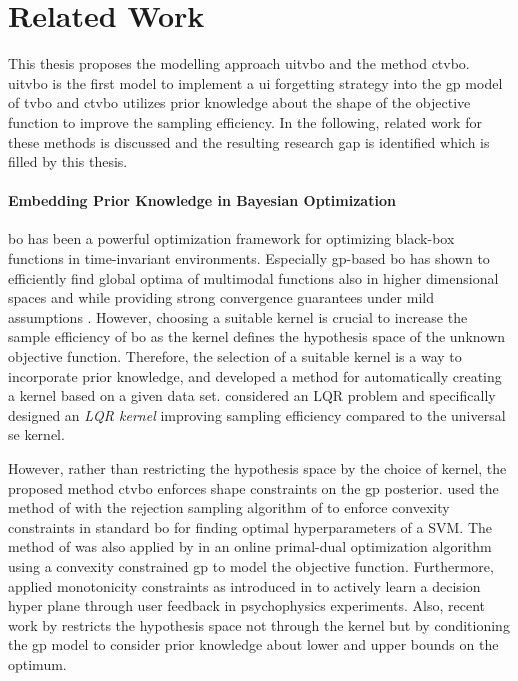 \chapter{Related Work}
\label{chap:related_work}


This thesis proposes the modelling approach \gls{uitvbo} and the method \gls{ctvbo}. \gls{uitvbo} is the first model to implement a \gls{ui} forgetting strategy into the \gls{gp} model of \gls{tvbo} and \gls{ctvbo} utilizes prior knowledge about the shape of the objective function to improve the sampling efficiency. In the following, related work for these methods is discussed and the resulting research gap is identified which is filled by this thesis.

\subsubsection{Embedding Prior Knowledge in Bayesian Optimization}

\gls{bo} has been a powerful optimization framework for optimizing black-box functions in time-invariant environments. Especially \gls{gp}-based \gls{bo} has shown to efficiently find global optima of multimodal functions also in higher dimensional spaces \cite{Snoek_2012} and while providing strong convergence guarantees under mild assumptions \cite{Srinivas_2010}. However, choosing a suitable kernel is crucial to increase the sample efficiency of \gls{bo} as the kernel defines the hypothesis space of the unknown objective function. Therefore, the selection of a suitable kernel is a way to incorporate prior knowledge, and \textcite{Duvenaud_2014} developed a method for automatically creating a kernel based on a given data set. \textcite{Marco_2017} considered an LQR problem and specifically designed an \emph{LQR kernel} improving sampling efficiency compared to the universal \gls{se} kernel.

However, rather than restricting the hypothesis space by the choice of kernel, the proposed method \gls{ctvbo} enforces shape constraints on the \gls{gp} posterior. \textcite{Jauch_2016} used the method of \textcite{Wang_2016} with the rejection sampling algorithm of \textcite{Botev2016} to enforce convexity constraints in standard \gls{bo} for finding optimal hyperparameters of a SVM. The method of \textcite{Wang_2016} was also applied by \textcite{Ospina_2021} in an online primal-dual optimization algorithm using a convexity constrained \gls{gp} to model the objective function. Furthermore, \textcite{Owen_2021} applied monotonicity constraints as introduced in \textcite{pmlr-v9-riihimaki10a} to actively learn a decision hyper plane through user feedback in psychophysics experiments.
Also, recent work by \textcite{Jeong_2021} restricts the hypothesis space not through the kernel but by conditioning the \gls{gp} model to consider prior knowledge about lower and upper bounds on the optimum.



